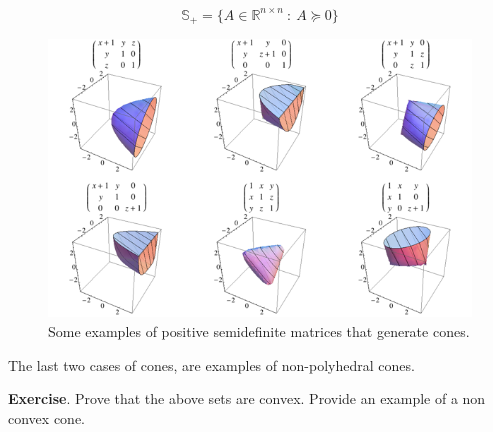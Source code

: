 \begin{itemize}
\begin{itemize}
        \begin{equation}
            \mathbb{S}_+ = \{A \in \mathbb{R}^{n \times n}\ :\ A \succeq 0\}
        \end{equation}
        \begin{figure}
            \centering
            \includegraphics[scale=0.4]{figures/2/chapter2-cones_positive_semidefinite_matrices.png}
            \caption{Some examples of positive semidefinite matrices that generate cones.}
            \label{fig:chapter2-cones_positive_semidefinite_matrices}
        \end{figure}
        The last two cases of cones, are examples of non-polyhedral cones.
    \end{itemize}
\end{itemize}
\par \textbf{Exercise}. Prove that the above sets are convex. Provide an example of a non convex cone.
%
